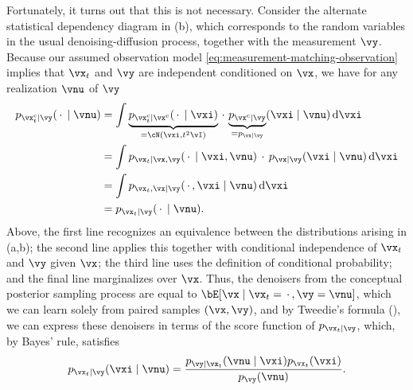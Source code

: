 \documentclass[../../book-main.tex]{subfiles}
\begin{document}
Fortunately, it turns out that this is not necessary.
Consider the alternate statistical dependency diagram in
(b), which corresponds to the random variables
in the usual denoising-diffusion process, together with the measurement $\vy$. 
Because our assumed observation model \eqref{eq:measurement-matching-observation}
implies that $\vx_t$ and $\vy$ are independent conditioned on $\vx$, we have for
any realization $\vnu$ of $\vy$
\begin{equation}\label{eq:conditional-denoising-conditioning-order-irrelevant}
  \begin{split}
  p_{\posteriorsample_t\mid \vy}(\spcdot \mid \vnu)
  &= \int
  \underbrace{p_{\posteriorsample_t \mid \posteriorsample}(\spcdot\mid \vxi)}_{=
  \cN(\vxi, t^2 \vI)}
  \spcdot \underbrace{p_{\posteriorsample \mid \vy}}_{= p_{\vx\mid \vy}}(\vxi \mid
  \vnu)
  \odif \vxi
  \\
  &=
  \int p_{\vx_t \mid \vx, \vy}(\spcdot\mid \vxi, \vnu) \spcdot p_{\vx \mid
  \vy}(\vxi\mid \vnu) \odif \vxi
  \\
  &=
  \int p_{\vx_t, \vx \mid \vy}(\spcdot, \vxi \mid \vnu) \odif \vxi
  \\
  &= p_{\vx_t \mid \vy}(\spcdot\mid \vnu).
  \end{split}
\end{equation}
Above, the first line recognizes an equivalence between the distributions
arising in  (a,b); the second line applies this
together with conditional independence of $\vx_t$ and $\vy$ given $\vx$; the
third line uses the definition of conditional probability; and the final line
marginalizes over $\vx$.
Thus, the denoisers from the conceptual posterior sampling process are equal to
$\bE[\vx \mid \vx_t=\spcdot, \vy=\vnu]$, which we can learn solely from paired samples $(\vx,
\vy)$,
and by Tweedie's formula (), we can express these denoisers in
terms of the score function of $p_{\vx_t \mid \vy}$, which, by Bayes' rule,
satisfies
\begin{equation}
  p_{\vx_t \mid \vy}(\vxi \mid \vnu) 
  = \frac{p_{\vy \mid \vx_t}(\vnu \mid \vxi) p_{\vx_t}(\vxi)}{p_{\vy}(\vnu)}.
\end{equation}
\end{document}
